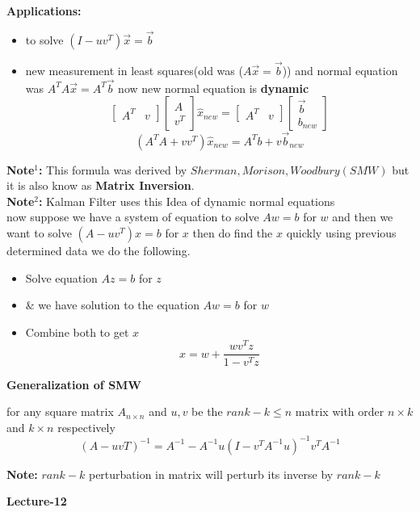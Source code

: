 \documentclass[a4paper]{article}
\numberwithin{equation}{section}
\begin{document}
\begin{itemize}
\textbf{Applications:}
\begin{itemize}
    \item to solve $(I-uv^T)\vec{x}=\vec{b}$
    \item new measurement in least squares(old was ($A\vec{x}=\vec{b}$)) and normal equation was $A^TA\vec{x}=A^T\vec{b}$ now new normal equation is \textbf{dynamic}
    \[\begin{bmatrix}
        A^T&v
    \end{bmatrix}\begin{bmatrix}
        A\\v^T
    \end{bmatrix}\hat{x}_{new}=\begin{bmatrix}
        A^T&v
    \end{bmatrix}\begin{bmatrix}
        \vec{b}\\b_{new}
    \end{bmatrix}\]
    \[(A^TA+vv^T)\hat{x}_{new}=A^Tb+v\vec{b}_{new}\]
\end{itemize}

\textbf{Note$^1$: }This formula was derived by $Sherman,Morison,Woodbury(SMW)$ but it is also know as \textbf{Matrix Inversion}.\\
\textbf{Note$^2$: } Kalman Filter uses this Idea of dynamic normal equations\\

now suppose we have a system of equation to solve $Aw=b$ for $w$ and then we want to solve $(A-uv^T)x=b$  for $x$ then do find the $x$ quickly using previous determined data we do the following.
\begin{itemize}
    \item Solve equation $Az=b$ for $z$
    \item \& we have solution to the equation $Aw=b$ for $w$
    \item Combine both to get $x$
    \[\boxed{x=w+\frac{wv^Tz}{1-v^Tz}}\]
\end{itemize}

\textbf{Generalization of SMW} 

for any square matrix $A_{n\times n}$ and $u,v$ be the $rank-k\leq n$ matrix with order $n\times k$ and $k\times n$ respectively
\[\boxed{(A-uvT)^{-1}=A^{-1}-A^{-1}u\left(I-v^TA^{-1}u\right)^{-1}v^TA^{-1}}\]

\textbf{Note:} $rank-k$ perturbation in matrix will perturb its inverse by $rank-k$\\
\begin{center}
    \textbf{\Huge{Lecture-12}}
\end{center}
\vspace{5pt}


\end{itemize}
\end{document}
